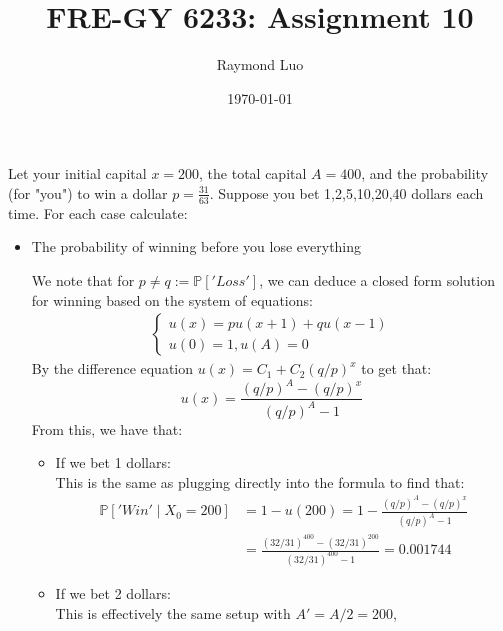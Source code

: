 \documentclass[12pt,twoside, letter]{exam}
\theoremstyle{definition}
\newcommand{\pp}{\mathbb{P}}
\begin{document}
\abovedisplayskip=12pt
\belowdisplayskip=12pt
\abovedisplayshortskip=7pt
\belowdisplayshortskip=10pt
\allowdisplaybreaks

\setlength{\parindent}{18pt}

\title{FRE-GY 6233: Assignment 10}
\author{Raymond Luo}
\date{\today}
\maketitle

\par{Let your initial capital $x = 200$, the total capital $A = 400$, and the probability (for "you") to win a
dollar $p = \frac{31}{63}$. Suppose you bet 1,2,5,10,20,40 dollars each time. For each case calculate:}

\begin{itemize}
  \item The probability of winning before you lose everything
    \begin{solution}
      We note that for $p \neq q := \pp['Loss']$, we can deduce a closed form solution for winning
      based on the system of equations:
      \begin{align*}
        \begin{cases}
          u(x) = pu(x+1) + qu(x-1) \\
          u(0) = 1, u(A) = 0
        \end{cases}
      \end{align*}
        By the difference equation $u(x) = C_1 + C_2(q/p)^x$ to get that:
        \begin{equation*}
          u(x) = \frac{(q/p)^A - (q/p)^x}{(q/p)^A-1}
        \end{equation*}
        From this, we have that:
        \begin{itemize}
          \item If we bet 1 dollars: \\
            This is the same as plugging directly into the formula to find that:
            \begin{align*}
              \pp['Win' \mid X_0 = 200] &= 1 - u(200) = 1 - \frac{(q/p)^A - (q/p)^x}{(q/p)^A-1} \\
              &= \frac{(32/31)^{400} - (32/31)^{200}}{(32/31)^{400}-1} = 0.001744
            \end{align*}
          \item If we bet 2 dollars: \\
            This is effectively the same setup with $A' = A/2 = 200$,

\end{itemize}
\end{solution}
\end{itemize}
\end{document}

